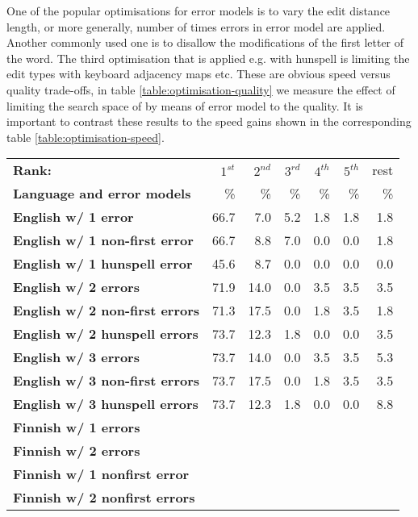 \documentclass[a4paper,12pt]{article}
\begin{document}
One of the popular optimisations for error models is to vary the edit distance
length, or more generally, number of times errors in error model are applied.
Another commonly used one is to disallow the modifications of the first
letter of the word. The third optimisation that is applied e.g. with hunspell
is limiting the edit types with keyboard adjacency maps etc.
These are obvious speed versus quality
trade-offs, in table \ref{table:optimisation-quality} we measure the effect of
limiting the search space of by means of error model to the quality. It is
important to contrast these results to the speed gains shown in the
corresponding table \ref{table:optimisation-speed}.

\begin{table}
    \centering
    \begin{tabular}{|l|r|r|r|r|r|r|}
        \hline
        \bf Rank: & $1^{st}$ & $2^{nd}$ & $3^{rd}$ & $4^{th}$ & $5^{th}$ & rest \\
        \bf Language and error models &  \% & \% & \% & \% & \% & \% \\
        \hline
        \bf English w/ 1 error     & 66.7 & 7.0  & 5.2 & 1.8 & 1.8 & 1.8 \\
 \bf English w/ 1 non-first error  & 66.7 & 8.8  & 7.0 & 0.0 & 0.0 & 1.8 \\
 \bf English w/ 1 hunspell error   & 45.6 & 8.7  & 0.0 & 0.0 & 0.0 & 0.0 \\
     \bf English w/ 2 errors       & 71.9 & 14.0 & 0.0 & 3.5 & 3.5 & 3.5 \\
 \bf English w/ 2 non-first errors & 71.3 & 17.5 & 0.0 & 1.8 & 3.5 & 1.8 \\
 \bf English w/ 2 hunspell errors  & 73.7 & 12.3 & 1.8 & 0.0 & 0.0 & 3.5 \\
   \bf English w/ 3 errors         & 73.7 & 14.0 & 0.0 & 3.5 & 3.5 & 5.3 \\
 \bf English w/ 3 non-first errors & 73.7 & 17.5 & 0.0 & 1.8 & 3.5 & 3.5 \\
 \bf English w/ 3 hunspell errors  & 73.7 & 12.3 & 1.8 & 0.0 & 0.0 & 8.8 \\
        \hline
        \bf Finnish w/ 1 errors & & & & & & \\
        \bf Finnish w/ 2 errors & & & & & & \\
\bf Finnish w/ 1 nonfirst error & & & & & & \\
        \bf Finnish w/ 2 nonfirst errors & & & & & & \\

\end{tabular}
\end{table}
\end{document}
